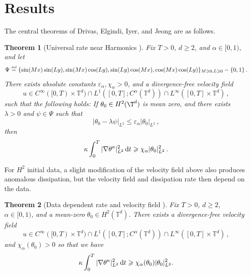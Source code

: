 \documentclass[12pt]{report}   %
\newcommand{\defeq}{\stackrel{\scriptscriptstyle\textup{def}}{=}}
\renewcommand{\le}{\leqslant}
\renewcommand{\geq}{\geqslant}
\renewcommand{\epsilon}{\varepsilon}
\numberwithin{equation}{section}
\theoremstyle{plain}
\newtheorem{theorem}{Theorem}
\theoremstyle{definition}
\theoremstyle{remark}
\DeclarePairedDelimiter{\abs}{\lvert}{\rvert}
\DeclarePairedDelimiter{\set}{\{}{\}}
\newcommand{\rmd}{\, \mathrm{d}}
\begin{document}
\section{Results}
The central theorems of Drivas, Elgindi, Iyer, and Jeong \cite{DrivasElgindiEA22} are as follows.
\begin{theorem}[Universal rate near Harmonics {\cite[Theorem~1.1]{DrivasElgindiEA22}}]\label{mainthm}
  Fix $T>0$, $d \geq 2$, and $\alpha \in [0,1)$, and let
  \begin{equation*}
    \Psi \defeq \set{ \sin( Mx ) \sin( Ly ), \sin( Mx) \cos( Ly ), \sin( Ly) \cos( Mx ), \cos( Mx ) \cos(Ly) }_{M\geq 0, L \geq 0} - \set{0, 1}\,.
  \end{equation*}
  There exists absolute constants $\epsilon_\alpha, \chi_\alpha >0$, and a divergence-free velocity field
  \begin{equation}\label{e:ureg}
    u\in C^\infty([0,T)\times \mathbb{T}^d) \cap L^1([0,T]; C^\alpha(\mathbb{T}^d)) \cap L^\infty([0,T]\times \mathbb{T}^d) \,,
  \end{equation}
  such that the following holds:
  If $\theta_0 \in H^2(\T^d)$ is mean zero, and there exists $\lambda > 0$ and $\psi \in \Psi$ such that
  \begin{equation*}
    |\theta_0 - \lambda \psi|_{L^2} \le \varepsilon_\alpha |\theta_0|_{L^2}\,,
  \end{equation*}
  then
  \begin{equation}\label{anomaly}
    \kappa \int_0^T |\nabla \theta^\kappa|_{L^2}^2 \rmd t
    \geq \chi_\alpha \abs{\theta_0}^2_{L^2} \,.
  \end{equation}
  \end{theorem}
  
For $H^2$ initial data, a slight modification of the velocity field above also produces anomalous dissipation, but the velocity field and dissipation rate then depend on the data. \\
\begin{theorem}[Data dependent rate and velocity field {\cite[Theorem~1.2]{DrivasElgindiEA22}}]\label{mainthm2}
  Fix $T>0$, $d \geq 2$, $\alpha \in [0,1)$, and a mean-zero $\theta_0\in H^2(\mathbb{T}^d)$. There exists a divergence-free velocity field  \begin{equation*}
    u\in C^\infty([0,T)\times \mathbb{T}^d) \cap L^1([0,T]; C^\alpha(\mathbb{T}^d)) \cap L^\infty([0,T]\times \mathbb{T}^d) \,,
  \end{equation*} and $\chi_\alpha(\theta_0)>0$ 
  so that we have
  \begin{equation}\label{anomaly2}
    \kappa \int_0^T |\nabla \theta^\kappa|_{L^2}^2 \rmd t
    \geq \chi_\alpha(\theta_0) \abs{\theta_0}^2_{L^2}. 
  \end{equation}
\end{theorem}
\end{document}
